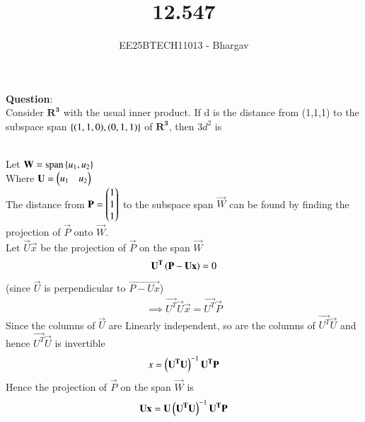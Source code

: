 \documentclass[journal]{IEEEtran}
\begin{document}

\vspace{3cm}

\title{12.547}
\author{EE25BTECH11013 - Bhargav}
\maketitle
    {\let\newpage\relax\maketitle}

\renewcommand{\thefigure}{\theenumi}
\renewcommand{\thetable}{\theenumi}
\setlength{\intextsep}{10pt} %

\renewcommand{\thetable}{\theenumi}

\textbf{Question}: \\
Consider $\mathbf{R^3}$ with the usual inner product. If d  is the distance from (1,1,1) to the subspace span $\left\{(1,1,0), (0,1,1)\right\}$ of $\mathbf{R^3}$, then $3d^2$ is

\solution \\
Let
$\mathbf{W} = \operatorname{span}\left\{u_1, u_2\right\}$\\
Where $\mathbf{U} = \begin{pmatrix}u_1 & u_2\end{pmatrix}$ \\

The distance from $\mathbf{P} = \begin{pmatrix}1 \\ 1 \\ 1\end{pmatrix}$ to the subspace span $\vec{W}$ can be found by finding the projection of $\vec{P}$ onto $\vec{W}$.\\
Let $\vec{U}\vec{x}$ be the projection of $\vec{P}$ on the span $\vec{W}$
\begin{align}
\mathbf{U^T}\left(\mathbf{P-Ux}\right)=0
\end{align}
(since $\vec{U}$ is perpendicular to $\vec{P-Ux}$)
\begin{align}
\implies \vec{U^T}\vec{U}\vec{x} = \vec{U^T}\vec{P}
\end{align}
Since the columns of $\vec{U}$ are Linearly independent, so are the columns of $\vec{U^T}\vec{U}$ and hence $\vec{U^T}\vec{U}$ is invertible 
\begin{align}
x = \left(\mathbf{U^T}\mathbf{U}\right)^{-1} \mathbf{U^T}\mathbf{P}
\end{align}
Hence the projection of $\vec{P}$ on the span $\vec{W}$ is
\begin{align}
\mathbf{U}\mathbf{x} = \mathbf{U}\left(\mathbf{U^T}\mathbf{U}\right)^{-1} \mathbf{U^T}\mathbf{P}
\end{align}
\end{document}
